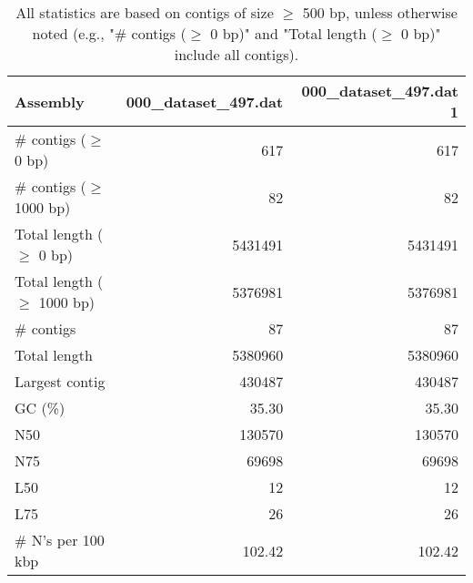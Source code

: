 \documentclass[12pt,a4paper]{article}
\begin{document}
\begin{table}[ht]
\begin{center}
\caption{All statistics are based on contigs of size $\geq$ 500 bp, unless otherwise noted (e.g., "\# contigs ($\geq$ 0 bp)" and "Total length ($\geq$ 0 bp)" include all contigs).}
\begin{tabular}{|l*{2}{|r}|}
\hline
Assembly & 000\_dataset\_497.dat & 000\_dataset\_497.dat 1 \\ \hline
\# contigs ($\geq$ 0 bp) & 617 & 617 \\ \hline
\# contigs ($\geq$ 1000 bp) & 82 & 82 \\ \hline
Total length ($\geq$ 0 bp) & 5431491 & 5431491 \\ \hline
Total length ($\geq$ 1000 bp) & 5376981 & 5376981 \\ \hline
\# contigs & 87 & 87 \\ \hline
Total length & 5380960 & 5380960 \\ \hline
Largest contig & 430487 & 430487 \\ \hline
GC (\%) & 35.30 & 35.30 \\ \hline
N50 & 130570 & 130570 \\ \hline
N75 & 69698 & 69698 \\ \hline
L50 & 12 & 12 \\ \hline
L75 & 26 & 26 \\ \hline
\# N's per 100 kbp & 102.42 & 102.42 \\ \hline
\end{tabular}
\end{center}
\end{table}
\end{document}
